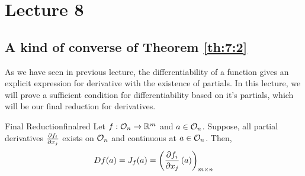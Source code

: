 \documentclass[../Analysis-3]{subfiles}
\begin{document}
\chapter*{Lecture 8} %
\setcounter{chapter}{8} %
\setcounter{section}{0}

\section{A kind of converse of Theorem \ref{th:7:2}}

As we have seen in previous lecture, the differentiability of a function gives an explicit expression for derivative with the existence of partials. In this lecture, we will prove a sufficient condition for differentiability based on it's partials, which will be our final reduction for derivatives.

\begin{Thm}{Final Reduction}{finalred}
  Let $ f :\mathcal{O}_{n} \to \mathbb{R}^m $ and $ a \in \mathcal{O}_{n} $. Suppose, all partial derivatives $ \pdv{f_i}{x_j} $ exists on $ \mathcal{O}_{n} $ and continuous at $ a \in \mathcal{O}_{n} $. Then,
  \begin{align*}
    Df(a) = J_{f}(a) = \left( \pdv{f_i}{x_j}\left( a \right) \right)_{m \times n}
  \end{align*}
\end{Thm}
\end{document}
